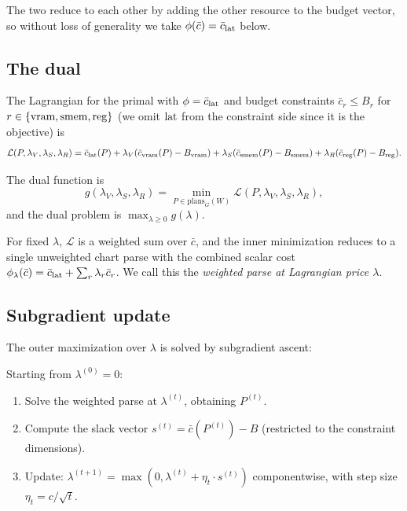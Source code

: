 The two reduce to each other by adding the other
resource to the budget vector, so without loss of
generality we take $\phi(\bar{c}) = \bar{c}_{\operatorname{lat}}$
below.

\subsection{The dual}

The Lagrangian for the primal with $\phi = \bar{c}_{\operatorname{lat}}$
and budget constraints $\bar{c}_r \leq B_r$ for
$r \in \{\operatorname{vram}, \operatorname{smem}, \operatorname{reg}\}$ (we omit $\operatorname{lat}$ from
the constraint side since it is the objective) is
\begin{equation}\label{eq:lagrangian}
  \mathcal{L}(P, \lambda_V, \lambda_S, \lambda_R) =
  \bar{c}_{\operatorname{lat}}(P) +
  \lambda_V (\bar{c}_{\operatorname{vram}}(P) - B_{\operatorname{vram}}) +
  \lambda_S (\bar{c}_{\operatorname{smem}}(P) - B_{\operatorname{smem}}) +
  \lambda_R (\bar{c}_{\operatorname{reg}}(P) - B_{\operatorname{reg}}).
\end{equation}

The dual function is
\begin{equation}
  g(\lambda_V, \lambda_S, \lambda_R) =
  \min_{P \in \mathrm{plans}_G(W)}
  \mathcal{L}(P, \lambda_V, \lambda_S, \lambda_R),
\end{equation}
and the dual problem is $\max_{\lambda \geq 0} g(\lambda)$.

For fixed $\lambda$, $\mathcal{L}$ is a weighted sum over
$\bar{c}$, and the inner minimization reduces to a
single unweighted chart parse with the combined scalar
cost $\phi_\lambda(\bar{c}) = \bar{c}_{\operatorname{lat}} +
\sum_r \lambda_r \bar{c}_r$. We call this the
\emph{weighted parse at Lagrangian price $\lambda$}.

\subsection{Subgradient update}

The outer maximization over $\lambda$ is solved by
subgradient ascent:

\begin{definition}\label{def:subgrad}
  Starting from $\lambda^{(0)} = 0$:
  \begin{enumerate}[nosep,label=(\arabic*)]
    \item Solve the weighted parse at $\lambda^{(t)}$,
      obtaining $P^{(t)}$.
    \item Compute the slack vector $s^{(t)} =
      \bar{c}(P^{(t)}) - B$ (restricted to the
      constraint dimensions).
    \item Update: $\lambda^{(t+1)} = \max(0,
      \lambda^{(t)} + \eta_t \cdot s^{(t)})$
      componentwise, with step size $\eta_t
      = c / \sqrt{t}$.
  \end{enumerate}
\end{definition}

